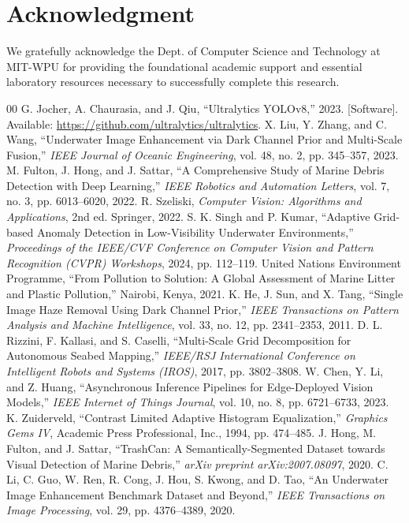 \documentclass[conference]{IEEEtran}
\begin{document}
\section*{Acknowledgment}
We gratefully acknowledge the Dept. of Computer Science and Technology at MIT-WPU for providing the foundational academic support and essential laboratory resources necessary to successfully complete this research.

\begin{thebibliography}{00}
 G. Jocher, A. Chaurasia, and J. Qiu, ``Ultralytics YOLOv8,'' 2023. [Software]. Available: \url{https://github.com/ultralytics/ultralytics}.
 X. Liu, Y. Zhang, and C. Wang, ``Underwater Image Enhancement via Dark Channel Prior and Multi-Scale Fusion,'' \textit{IEEE Journal of Oceanic Engineering}, vol. 48, no. 2, pp. 345--357, 2023.
 M. Fulton, J. Hong, and J. Sattar, ``A Comprehensive Study of Marine Debris Detection with Deep Learning,'' \textit{IEEE Robotics and Automation Letters}, vol. 7, no. 3, pp. 6013--6020, 2022.
 R. Szeliski, \textit{Computer Vision: Algorithms and Applications}, 2nd ed. Springer, 2022.
 S. K. Singh and P. Kumar, ``Adaptive Grid-based Anomaly Detection in Low-Visibility Underwater Environments,'' \textit{Proceedings of the IEEE/CVF Conference on Computer Vision and Pattern Recognition (CVPR) Workshops}, 2024, pp. 112--119.
 United Nations Environment Programme, ``From Pollution to Solution: A Global Assessment of Marine Litter and Plastic Pollution,'' Nairobi, Kenya, 2021.
 K. He, J. Sun, and X. Tang, ``Single Image Haze Removal Using Dark Channel Prior,'' \textit{IEEE Transactions on Pattern Analysis and Machine Intelligence}, vol. 33, no. 12, pp. 2341--2353, 2011.
 D. L. Rizzini, F. Kallasi, and S. Caselli, ``Multi-Scale Grid Decomposition for Autonomous Seabed Mapping,'' \textit{IEEE/RSJ International Conference on Intelligent Robots and Systems (IROS)}, 2017, pp. 3802--3808.
 W. Chen, Y. Li, and Z. Huang, ``Asynchronous Inference Pipelines for Edge-Deployed Vision Models,'' \textit{IEEE Internet of Things Journal}, vol. 10, no. 8, pp. 6721--6733, 2023.
 K. Zuiderveld, ``Contrast Limited Adaptive Histogram Equalization,'' \textit{Graphics Gems IV}, Academic Press Professional, Inc., 1994, pp. 474--485.
 J. Hong, M. Fulton, and J. Sattar, ``TrashCan: A Semantically-Segmented Dataset towards Visual Detection of Marine Debris,'' \textit{arXiv preprint arXiv:2007.08097}, 2020.
 C. Li, C. Guo, W. Ren, R. Cong, J. Hou, S. Kwong, and D. Tao, ``An Underwater Image Enhancement Benchmark Dataset and Beyond,'' \textit{IEEE Transactions on Image Processing}, vol. 29, pp. 4376--4389, 2020.

\end{thebibliography}
\end{document}
